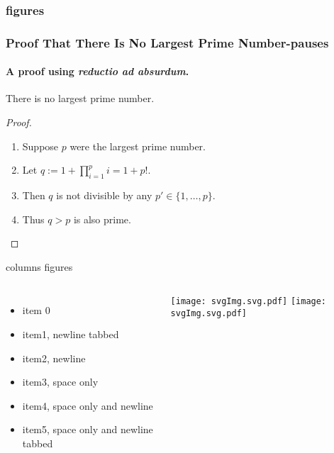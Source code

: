 \documentclass[aspectratio=169]{beamer}
\begin{document}
\subsubsection{figures}
\begin{frame}
	\frametitle{Proof That There Is No Largest Prime Number-pauses}
	\framesubtitle{A proof using \textit{reductio ad absurdum}.}

	\begin{theorem}
		There is no largest prime number.
	\end{theorem}
	\begin{proof}
		\begin{enumerate}
		\item Suppose $p$ were the largest prime number.
		\pause
		\item Let $q := 1 + \prod_{i=1}^p i = 1+p!$.
		\item Then $q$ is not divisible by any $p' \in \{1,\dots,p\}$.
		\pause
		\item Thus $q>p$ is also prime.\qedhere
		\end{enumerate}
	\end{proof}
\end{frame}

\begin{frame} {columns figures}	
\begin{columns}
		\begin{itemize}
			\item	item 0
			\item	
				item1, newline tabbed
			\item	
			item2, newline
			\item item3, space only
			\item item4, space only
			and newline
			\item item5, space only
				and newline tabbed
		\end{itemize}
  		\texttt{[image: svgImg.svg.pdf]}
  		\texttt{[image: svgImg.svg.pdf]}
\end{columns}
\end{frame}
\end{document}
